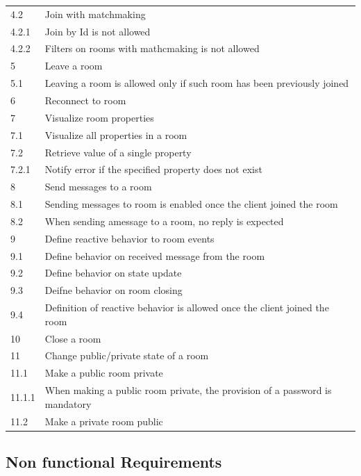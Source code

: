 \begin{center}
\begin{longtable}{|l|l|}
4.2     & Join with matchmaking \\
4.2.1   & Join by Id is not allowed \\
4.2.2   & Filters on rooms with mathcmaking is not allowed \\
5       & Leave a room \\
5.1     & Leaving a room is allowed only if such room has been previously joined \\
6       & Reconnect to room \\
7       & Visualize room properties \\
7.1     & Visualize all properties in a room \\
7.2     & Retrieve value of a single property \\
7.2.1   & Notify error if the specified property does not exist \\
8       & Send messages to a room \\
8.1     & Sending messages to room is enabled once the client joined the room \\
8.2     & When sending amessage to a room, no reply is expected \\
9       & Define reactive behavior to room events \\
9.1     & Define behavior on received message from the room \\
9.2     & Define behavior on state update \\
9.3     & Deifne behavior on room closing \\
9.4     & Definition of reactive behavior is allowed once the client joined the room \\
10      & Close a room \\
11      & Change public/private state of a room \\
11.1    & Make a public room private \\
11.1.1  & When making a public room private, the provision of a password is mandatory \\ 
11.2    & Make a private room public \\
\hline

  \end{longtable}
\end{center}

\newpage

\subsection{Non functional Requirements} 

